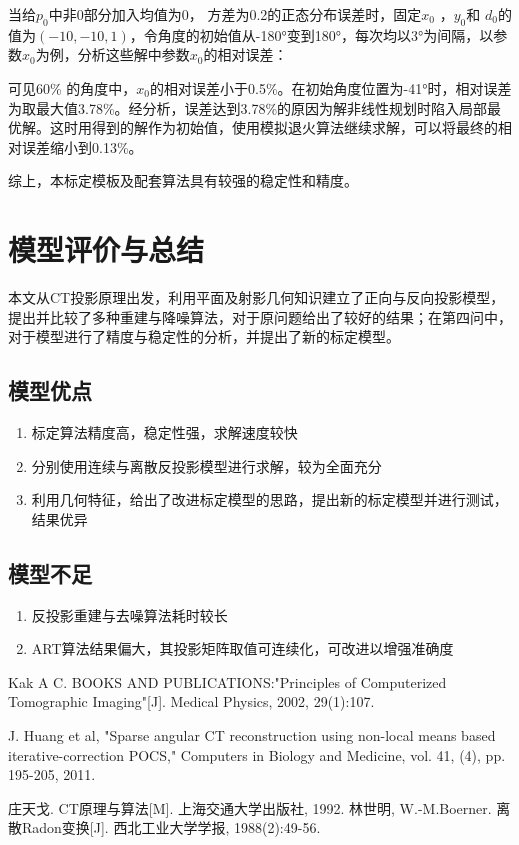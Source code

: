 \documentclass{myart}
\begin{document}
当给\(p_0\)中非0部分加入均值为0， 方差为0.2的正态分布误差时，固定\( x_0 \) ，\(y_0\)和 \(d_0\)的值为\( (-10, -10, 1)\)，令角度的初始值从-180°变到180°，每次均以3°为间隔，以参数\(x_0\)为例，分析这些解中参数\(x_0\)的相对误差：


可见60\% 的角度中，\(x_0\)的相对误差小于0.5\%。在初始角度位置为-41°时，相对误差为取最大值3.78\%。经分析，误差达到3.78\%的原因为解非线性规划时陷入局部最优解。这时用得到的解作为初始值，使用模拟退火算法继续求解，可以将最终的相对误差缩小到0.13\%。

综上，本标定模板及配套算法具有较强的稳定性和精度。

\section{模型评价与总结}
本文从CT投影原理出发，利用平面及射影几何知识建立了正向与反向投影模型，提出并比较了多种重建与降噪算法，对于原问题给出了较好的结果；在第四问中，对于模型进行了精度与稳定性的分析，并提出了新的标定模型。
\subsection{模型优点}
\begin{enumerate}
\item 标定算法精度高，稳定性强，求解速度较快
\item 分别使用连续与离散反投影模型进行求解，较为全面充分
\item 利用几何特征，给出了改进标定模型的思路，提出新的标定模型并进行测试，结果优异
\end{enumerate}

\subsection{模型不足}
\begin{enumerate}
\item 反投影重建与去噪算法耗时较长
\item ART算法结果偏大，其投影矩阵取值可连续化，可改进以增强准确度
\end{enumerate}


\begin{thebibliography}{0}

Kak A C. BOOKS AND PUBLICATIONS:"Principles of Computerized Tomographic Imaging"[J]. Medical Physics, 2002, 29(1):107.

J. Huang et al, "Sparse angular CT reconstruction using non-local means based iterative-correction POCS," Computers in Biology and Medicine, vol. 41, (4), pp. 195-205, 2011.

庄天戈. CT原理与算法[M]. 上海交通大学出版社, 1992.
林世明, W.-M.Boerner. 离散Radon变换[J]. 西北工业大学学报, 1988(2):49-56.
\end{thebibliography}
\appendix
\appendixpage
\addappheadtotoc
\end{document}

